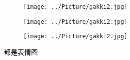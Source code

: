 \documentclass[a4paper,UTF8]{article}
\begin{document}
\begin{figure}[ht]
  \centering
  \begin{subfigure}[t]{0.3\textwidth}
    \centering
    \texttt{[image: ../Picture/gakki2.jpg]}
  \end{subfigure}
  \quad
  \begin{subfigure}[t]{0.3\textwidth}
    \centering
    \texttt{[image: ../Picture/gakki2.jpg]}
  \end{subfigure}
  \quad
  \begin{subfigure}[t]{0.3\textwidth}
    \centering
    \texttt{[image: ../Picture/gakki2.jpg]}
  \end{subfigure}
  \caption*{都是表情图}
\end{figure}
\end{document}
